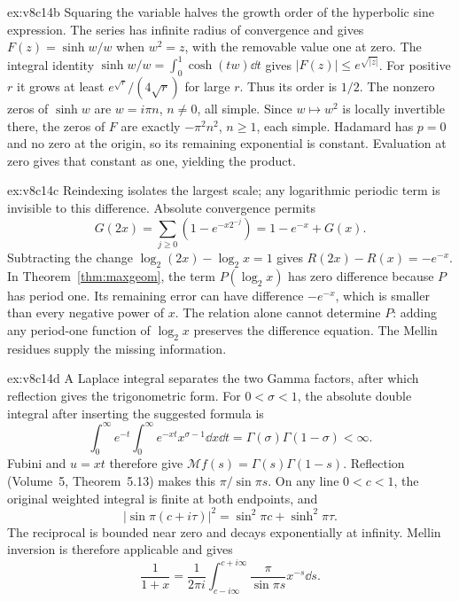 \begin{solution}{ex:v8c14b}
\idea Squaring the variable halves the growth order of the hyperbolic sine expression.
\writeup The series has infinite radius of convergence and gives $F(z)=\sinh w/w$ when $w^2=z$, with the removable value one at zero. The integral identity $\sinh w/w=\int_0^1\cosh(tw)\dd t$ gives $|F(z)|\le e^{\sqrt{|z|}}$. For positive $r$ it grows at least $e^{\sqrt r}/(4\sqrt r)$ for large $r$. Thus its order is $1/2$. The nonzero zeros of $\sinh w$ are $w=i\pi n$, $n\ne0$, all simple. Since $w\mapsto w^2$ is locally invertible there, the zeros of $F$ are exactly $-\pi^2n^2$, $n\ge1$, each simple. Hadamard has $p=0$ and no zero at the origin, so its remaining exponential is constant. Evaluation at zero gives that constant as one, yielding the product.
\end{solution}
\begin{solution}{ex:v8c14c}
\idea Reindexing isolates the largest scale; any logarithmic periodic term is invisible to this difference.
\writeup Absolute convergence permits
\[G(2x)=\sum_{j\ge0}(1-e^{-x2^{-j}})=1-e^{-x}+G(x).
\]
Subtracting the change $\log_2(2x)-\log_2x=1$ gives $R(2x)-R(x)=-e^{-x}$. In Theorem~\ref{thm:maxgeom}, the term $P(\log_2x)$ has zero difference because $P$ has period one. Its remaining error can have difference $-e^{-x}$, which is smaller than every negative power of $x$. The relation alone cannot determine $P$: adding any period-one function of $\log_2x$ preserves the difference equation. The Mellin residues supply the missing information.
\end{solution}
\begin{solution}{ex:v8c14d}
\idea A Laplace integral separates the two Gamma factors, after which reflection gives the trigonometric form.
\writeup For $0<\sigma<1$, the absolute double integral after inserting the suggested formula is
\[\int_0^\infty e^{-t}\int_0^\infty e^{-xt}x^{\sigma-1}\dd x\dd t
 =\Gamma(\sigma)\Gamma(1-\sigma)<\infty.
\]
Fubini and $u=xt$ therefore give $\mathcal Mf(s)=\Gamma(s)\Gamma(1-s)$. Reflection (Volume~5, Theorem~5.13) makes this $\pi/\sin\pi s$. On any line $0<c<1$, the original weighted integral is finite at both endpoints, and
\[|\sin\pi(c+i\tau)|^2=\sin^2\pi c+\sinh^2\pi\tau.
\]
The reciprocal is bounded near zero and decays exponentially at infinity. Mellin inversion is therefore applicable and gives
\[\frac1{1+x}=\frac1{2\pi i}\int_{c-i\infty}^{c+i\infty}\frac\pi{\sin\pi s}x^{-s}\dd s.
\]
\end{solution}


